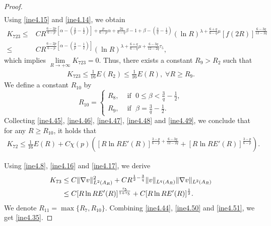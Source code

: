 \documentclass[10pt,a4paper]{amsart}
\begin{document}
\begin{proof}
\begin{align}
\end{align}
Using \eqref{ine4.15} and \eqref{ine4.14}, we obtain
\begin{align*}
K_{723}\leq&CR^{\frac{6-2p}{6-p}\left[\alpha-\left(\frac{3}{p}-\frac{1}{2}\right)\right]+\frac{p}{6-p}\alpha+\frac{2q}{6-q}\beta-1+\beta-\left(\frac{3}{q}-\frac{1}{2}\right)}(\ln R)^{\lambda+\frac{6+q}{6-q}\mu} \left[f(2R)\right]^{\frac{6-3q}{12-2q}}\\
\leq&CR^{\frac{6-2p}{6-p}\left[\alpha-\left(\frac{3}{p}-\frac{1}{2}\right)\right]}(\ln R)^{\lambda+\frac{6+q}{6-q}\mu+\frac{6-3q}{12-2q}\tau_5},
\end{align*}
which implies $\lim\limits_{R\rightarrow+\infty}K_{723}=0$.
Thus, there exists a constant $R_9>R_2$ such that
\begin{align}\label{ine4.49}
	K_{723}\leq\frac{1}{16}E(R_2)\leq \frac{1}{16}E(R),\;\forall R\geq R_9.
\end{align}
We define a constant $R_{10}$ by
\begin{equation*}
R_{10}=
\begin{cases}
R_8, & \text{ if  }\;0\leq\beta<\frac{3}{q}-\frac{1}{2}, \\
R_9, & \text{ if  }\;\beta=\frac{3}{q}-\frac{1}{2}.
\end{cases}
\end{equation*}
Collecting \eqref{ine4.45}, \eqref{ine4.46}, \eqref{ine4.47}, \eqref{ine4.48} and \eqref{ine4.49},
we conclude that for any $R\geq R_{10}$, it holds that
\begin{align}\label{ine4.50}
K_{72}\leq \frac{1}{16}E(R)+C\chi(p)\left(\left[R\ln RE'(R)\right]^{\frac{3-p}{6-p}+\frac{6-3q}{12-2q}}+\left[R\ln RE'(R)\right]^{\frac{3-p}{6-p}}\right).
\end{align}

Using \eqref{ine4.8}, \eqref{ine4.16} and \eqref{ine4.17}, we derive
\begin{align}\label{ine4.51}
	K_{73} &\leq C\|\nabla v\|_{L^2 (A_R)}^2+CR^{\frac{1}{2}-\frac{3}{q}}\|v\|_{L^q(A_R)}\|\nabla v\|_{L^2 (A_R)}\notag\\
           &\leq C[R\ln RE'(R)]^\frac{\tau_5}{1+\tau_5}+C[R\ln RE'(R)]^\frac{1}{2}.
\end{align}
We denote $R_{11}=\max\{R_7,R_{10}\}$. Combining \eqref{ine4.44}, \eqref{ine4.50} and \eqref{ine4.51}, we get \eqref{ine4.35}.
\end{proof}
\end{document}
